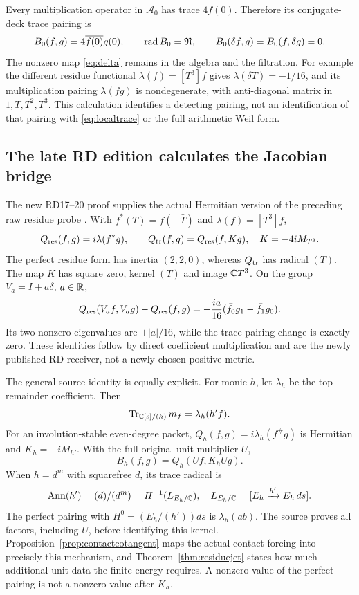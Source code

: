 \documentclass[11pt,a4paper]{article}
\theoremstyle{definition}
\newcommand{\rad}{\operatorname{rad}}\newcommand{\ord}{\operatorname{ord}}
\begin{document}
Every multiplication operator in $\mathscr A_0$ has trace $4f(0)$. Therefore its conjugate-deck trace pairing is
\begin{equation}\label{eq:localtrace}
 B_0(f,g)=4\overline{f(0)}g(0),
 \qquad\rad B_0=\N,
 \qquad B_0(\delta f,g)=B_0(f,\delta g)=0.
\end{equation}
The nonzero map \eqref{eq:delta} remains in the algebra and the filtration. For example the different residue functional $\lambda(f)=[T^3]f$ gives
$\lambda(\delta T)=-1/16$, and its multiplication pairing $\lambda(fg)$ is nondegenerate, with anti-diagonal matrix in $1,T,T^2,T^3$. This calculation identifies a detecting pairing, not an identification of that pairing with \eqref{eq:localtrace} or the full arithmetic Weil form.

\subsection{The late RD edition calculates the Jacobian bridge}
The new RD17--20 proof supplies the actual Hermitian version of the preceding raw residue probe \citep{RD}. With $f^*(T)=\overline{f(-\bar T)}$ and $\lambda(f)=[T^3]f$,
\[
 Q_{\rm res}(f,g)=i\lambda(f^*g),\qquad
 Q_{\rm tr}(f,g)=Q_{\rm res}(f,Kg),\quad K=-4iM_{T^3}.
\]
The perfect residue form has inertia $(2,2,0)$, whereas $Q_{\rm tr}$ has radical $(T)$. The map $K$ has square zero, kernel $(T)$ and image $\mathbb C T^3$. On the group $V_a=I+a\delta$, $a\in\mathbb R$,
\[
 Q_{\rm res}(V_af,V_ag)-Q_{\rm res}(f,g)
 =-\frac{ia}{16}(\bar f_0g_1-\bar f_1g_0).
\]
Its two nonzero eigenvalues are $\pm|a|/16$, while the trace-pairing change is exactly zero. These identities follow by direct coefficient multiplication and are the newly published RD receiver, not a newly chosen positive metric.

The general source identity is equally explicit. For monic $h$, let $\lambda_h$ be the top remainder coefficient. Then
\[
 \operatorname{Tr}_{\mathbb C[s]/(h)}m_f=\lambda_h(h'f).
\]
For an involution-stable even-degree packet, $Q_h(f,g)=i\lambda_h(f^\#g)$ is Hermitian and $K_h=-iM_{h'}$. With the full original unit multiplier $U$,
\[
 B_h(f,g)=Q_h(Uf,K_hUg).
\]
When $h=d^m$ with squarefree $d$, its trace radical is
\[
 \operatorname{Ann}(h')=(d)/(d^m)=H^{-1}(L_{E_h/\mathbb C}),
 \quad L_{E_h/\mathbb C}=[E_h\xrightarrow{h'}E_h\,ds].
\]
The perfect pairing with $H^0=(E_h/(h'))ds$ is $\lambda_h(ab)$. The source proves all factors, including $U$, before identifying this kernel. Proposition~\ref{prop:contactcotangent} maps the actual contact forcing into precisely this mechanism, and Theorem~\ref{thm:residuejet} states how much additional unit data the finite energy requires. A nonzero value of the perfect pairing is not a nonzero value after $K_h$.
\end{document}
